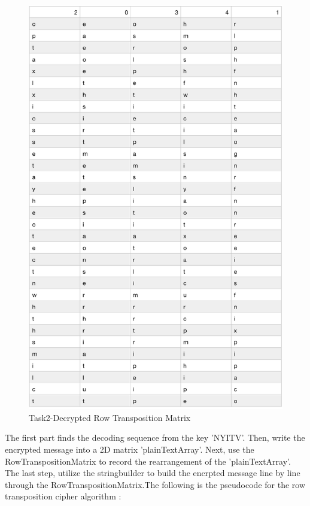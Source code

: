 \documentclass[twoside,twocolumn]{article}
\begin{document}
\begin{figure}[H]
  \centering
  \includegraphics[scale=0.39]{./Graphs/Figure1.8.png}
  \caption{Task2-Decrypted Row Transposition Matrix \\}
  \label{fig:testfig1}
\end{figure}

\vspace*{0.0cm}
The first part finds the decoding sequence from the key 'NYITV'. Then, write the encrypted message into a 2D matrix 'plainTextArray'. Next, use the RowTranspositionMatrix to record the rearrangement of the 'plainTextArray'. The last step, utilize the stringbuilder to build the encrpted message line by line through the RowTranspositionMatrix.The following is the pseudocode for the row transposition cipher algorithm : \\
\end{document}
